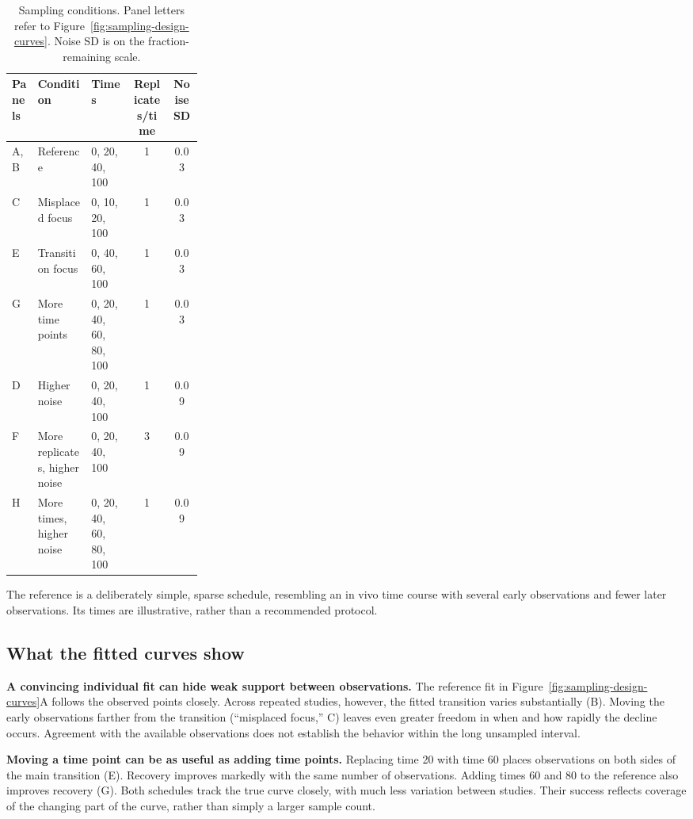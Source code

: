 \begin{table}[htbp]
  \centering
  \small
  \caption{Sampling conditions. Panel letters refer to
    Figure~\ref{fig:sampling-design-curves}. Noise SD is on the fraction-remaining scale.}
  \label{tab:sampling-design-conditions}
  \renewcommand{\arraystretch}{1.1}
  \begin{tabular}{@{}lp{0.28\linewidth}lcc@{}}
    \hline
    Panels & Condition & Times & Replicates/time & Noise SD \\
    \hline
    A, B & Reference          & 0, 20, 40, 100         & 1 & 0.03 \\
    C    & Misplaced focus    & 0, 10, 20, 100         & 1 & 0.03 \\
    E    & Transition focus   & 0, 40, 60, 100         & 1 & 0.03 \\
    G    & More time points   & 0, 20, 40, 60, 80, 100 & 1 & 0.03 \\
    D    & Higher noise       & 0, 20, 40, 100         & 1 & 0.09 \\
    F    & More replicates, higher noise & 0, 20, 40, 100 & 3 & 0.09 \\
    H    & More times, higher noise & 0, 20, 40, 60, 80, 100 & 1 & 0.09 \\
    \hline
  \end{tabular}
\end{table}

The reference is a deliberately simple, sparse schedule, resembling an in vivo
time course with several early observations and fewer later observations. Its
times are illustrative, rather than a recommended protocol.

\subsection{What the fitted curves show}

\textbf{A convincing individual fit can hide weak support between observations.}
The reference fit in Figure~\ref{fig:sampling-design-curves}A follows the observed
points closely. Across repeated studies, however, the fitted transition varies
substantially (B). Moving the early observations farther from the transition
(``misplaced focus,'' C) leaves even greater freedom in when and how rapidly the
decline occurs. Agreement with the available observations does not establish the
behavior within the long unsampled interval.

\textbf{Moving a time point can be as useful as adding time points.}
Replacing time 20 with time 60 places observations on both sides of the main
transition (E). Recovery improves markedly with the same number of observations.
Adding times 60 and 80 to the reference also improves recovery (G). Both schedules
track the true curve closely, with much less variation between studies. Their
success reflects coverage of the changing part of the curve, rather than simply
a larger sample count.

